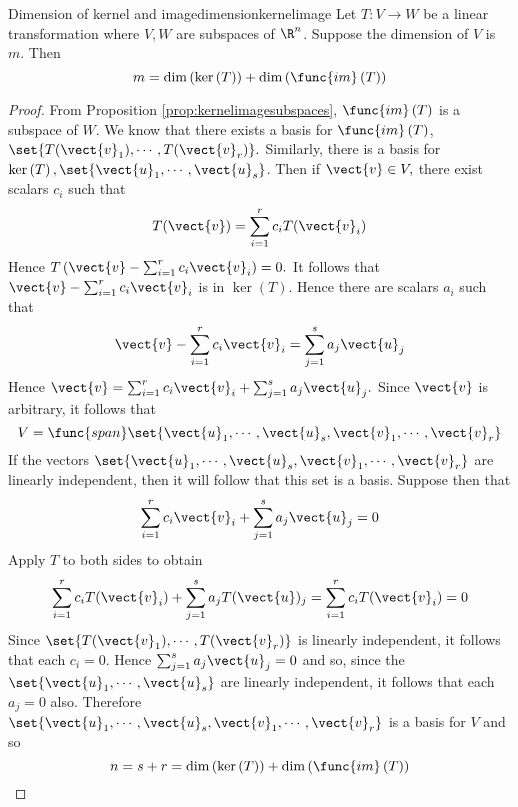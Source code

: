 \begin{theorem}{Dimension of kernel and image}{dimensionkernelimage}
Let $T:V\rightarrow W$ be a linear transformation where $V,W$ are subspaces of $\R^n$. Suppose the dimension of $V$ is $m$. Then 
\[
m=\dim \left( \ker \left( T\right) \right) +\dim \left( \func{im}\left(
T\right) \right) 
\]
\end{theorem}

\begin{proof}
From Proposition \ref{prop:kernelimagesubspaces}, $\func{im}\left( T\right) $ is a subspace of $W.$ We know that there exists a basis for $\func{im}\left( T\right)$, $\set{T(\vect{v}
_{1}),\cdots ,T(\vect{v}_{r})} . $ Similarly, there is a basis for $\ker
\left( T\right) ,\set{\vect{u}_{1},\cdots ,\vect{u}_{s}} $. Then if $
\vect{v}\in V,$ there exist scalars $c_{i}$ such that 
\begin{equation*}
T(\vect{v})=\sum_{i=1}^{r}c_{i}T(\vect{v}_{i})
\end{equation*}
Hence $T\left( \vect{v}-\sum_{i=1}^{r}c_{i}\vect{v}_{i}\right) =0.$ It follows
that $\vect{v}-\sum_{i=1}^{r}c_{i}\vect{v}_{i}$ is in $\ker \left( T\right) $.
Hence there are scalars $a_{i}$ such that 
\begin{equation*}
\vect{v}-\sum_{i=1}^{r}c_{i}\vect{v}_{i}=\sum_{j=1}^{s}a_{j}\vect{u}_{j}
\end{equation*}
Hence $\vect{v}=\sum_{i=1}^{r}c_{i}\vect{v}_{i}+\sum_{j=1}^{s}a_{j}\vect{u}
_{j}. $ Since $\vect{v}$ is arbitrary, it follows that 
\begin{equation*}
V=\func{span}\set{\vect{u}_{1},\cdots ,\vect{u}_{s},\vect{v}_{1},\cdots ,
\vect{v}_{r}}
\end{equation*}
If the vectors $\set{\vect{u}_{1},\cdots ,\vect{u}_{s},\vect{v}_{1},\cdots ,
\vect{v}_{r}} $ are linearly independent, then it will follow that
this set is a basis. Suppose then that 
\begin{equation*}
\sum_{i=1}^{r}c_{i}\vect{v}_{i}+\sum_{j=1}^{s}a_{j}\vect{u}_{j}=0
\end{equation*}
Apply $T$ to both sides to obtain 
\begin{equation*}
\sum_{i=1}^{r}c_{i}T(\vect{v}_{i})+\sum_{j=1}^{s}a_{j}T(\vect{u})
_{j}=\sum_{i=1}^{r}c_{i}T(\vect{v}_{i})=0
\end{equation*}
Since $\set{T(\vect{v}_{1}),\cdots ,T(\vect{v}_{r})} $ is linearly
independent, it follows that each $c_{i}=0.$ Hence $\sum_{j=1}^{s}a_{j}\vect{u
}_{j}=0$ and so, since the $\set{\vect{u}_{1},\cdots ,\vect{u}_{s}} $
are linearly independent, it follows that each $a_{j}=0$ also. Therefore $\set{\vect{u}_{1},\cdots ,\vect{u}_{s},\vect{v}_{1},\cdots ,\vect{v}
_{r}} $ is a basis for $V$ and so 
\begin{equation*}
n=s+r=\dim \left( \ker \left( T\right) \right) +\dim \left( \func{im}\left(
T\right) \right) 
\end{equation*}
\end{proof}

